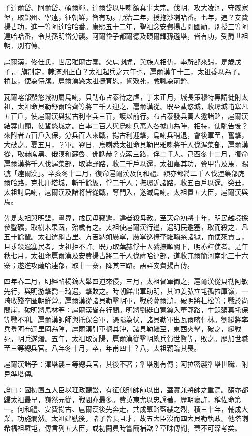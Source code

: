 \begin{pinyinscope}
子達爾岱、阿爾岱、碩爾輝。達爾岱以甲喇額真事太宗。伐明，攻大凌河，守臧家堡，取錦州、寧遠，征朝鮮，皆有功。順治二年，授拖沙喇哈番。七年，追？安費揚古功，進一等阿達哈哈番。康熙五十二年，聖祖念安費揚古開國勛，別授三等阿達哈哈番，令其孫明岱分襲。阿爾岱子都爾德及碩爾輝孫遜塔，皆有功，受爵世祖朝，別有傳。

扈爾漢，佟佳氏，世居雅爾古寨。父扈喇虎，與族人相仇，率所部來歸，是歲戊子，。旗制定，隸滿洲正白？太祖起兵之六年也，扈爾漢年十三，太祖養以為子。稍長，使為侍旗。扈爾漢感太祖撫育恩，誓效死，戰輒為前鋒。

瓦爾喀部蜚悠城初屬烏喇，貝勒布占泰待之虐，丁未正月，城長策穆特黑請徙附太祖，太祖命貝勒舒爾哈齊等將三千人迎之，扈爾漢從。既至蜚悠城，收環城屯寨凡五百戶，使扈爾漢與揚古利率兵三百，護以前行。布占泰發兵萬人邀諸路，扈爾漢結寨山巔，使蜚悠城之。自率二百人與烏喇兵萬人各據山為陣，相持，使馳告後？來附者五百戶入保，分兵百人來戰，揚古利迎擊，烏喇兵稍退，會後軍至，奮擊，大破之。夏五月，？軍。翌日，烏喇悉太祖命貝勒巴雅喇將千人伐渥集部，扈爾漢從，取赫席黑、俄漠和蘇魯、佛訥赫？克索三路，俘二千人。己酉冬十二月，復命扈爾漢將千人伐渥集部，取滹野路，收二千戶以還，太祖嘉其功，賚甲胄及馬，賜號「達爾漢」。辛亥冬十二月，復命扈爾漢及何和禮、額亦都將二千人伐渥集部虎爾哈路，克扎庫塔城，斬千餘級，俘二千人；撫環近諸路，收五百戶以還。癸丑，太祖討烏喇，扈爾漢及諸將皆從戰，奪門入，遂滅烏喇。太祖置五大臣，扈爾漢與焉。

先是太祖與明盟，畫界，戒民毋竊逾，違者殺毋赦。至天命初將十年，明民越境採參鑿礦，取樹木果蔬，殆歲有之。太祖使扈爾漢行邊，遇明民逾塞，取而殺之，凡五十餘輩。太祖遣綱古里、方吉納如廣寧，廣寧巡撫李維翰系諸獄，而使來責言，且求殺逾塞民者，太祖拒不許。既乃取葉赫俘十人戮撫順關下，明亦釋使者。是年秋七月，太祖命扈爾漢及安費揚古將二千人伐薩哈連部，道收兀爾簡河南北三十六寨；遂進攻薩哈連部，取十一寨，降其三路。語詳安費揚古傳。

四年春二月，明經略楊鎬大舉四道來侵，三月，太祖督軍御之，扈爾漢從貝勒阿敏先行，與明游擊喬一琦遇，擊敗之。時朝鮮出軍助明，其帥姜弘立屯孤拉庫嶺，一琦收殘卒匿朝鮮營。扈爾漢從諸貝勒擊明軍，戰於薩爾滸，破明將杜松等；戰於尚間崖，破明將馬林等：扈爾漢皆在行間。明將劉綎自寬奠入董鄂路，牛錄額真托保等戰不利。扈爾漢帥師與托保合軍，憑隘為伏，諸貝勒軍出瓦爾喀什林。劉綎將率兵登阿布達里岡為陣，扈爾漢引軍扼其沖，諸貝勒繼至，東西夾擊，破之，綎戰死，明兵遂熸。五年，太祖取沈陽，扈爾漢從擊明總兵賀世賢等，敗之。歷加世職至三等總兵官。八年冬十月，卒，年甫四十？八，太祖親臨其喪。

扈爾漢諸子：渾塔襲三等總兵官，其後不著；準塔別有傳；阿拉密襲準塔世職，附見準塔傳。

論曰：國初置五大臣以理政聽訟，有征伐則帥師以出，蓋實兼將帥之重焉。額亦都歸太祖最早，巍然元從，戰閥亦最多。費英東尤以忠讜著，歷朝褒許，稱佐命第一。何和禮、安費揚古、扈爾漢後先奔走，共成篳路藍縷之烈，積三十年，輔成大業，功施爛然。太祖建號後，諸子皆長且才，故五大臣沒而四大貝勒執政。他塔喇希福祖羅屯，傳言列五大臣，或初闕員時嘗簡補歟？草昧傳聞，蓋不可深考矣。


\end{pinyinscope}